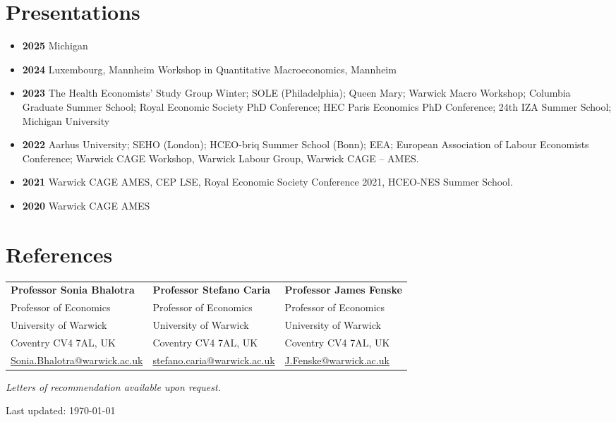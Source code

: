 \documentclass[11pt,a4paper]{article}
\begin{document}
\section{Presentations}
\begin{itemize}[leftmargin=*, itemsep=0.2em, label={}]
    \item \textbf{2025} \quad Michigan
    \item \textbf{2024} \quad Luxembourg, Mannheim Workshop in Quantitative Macroeconomics, Mannheim
    \item \textbf{2023} \quad The Health Economists' Study Group Winter; SOLE (Philadelphia); Queen Mary; Warwick Macro Workshop; Columbia Graduate Summer School; Royal Economic Society PhD Conference; HEC Paris Economics PhD Conference; 24th IZA Summer School; Michigan University
    \item \textbf{2022} \quad Aarhus University; SEHO (London); HCEO-briq Summer School (Bonn); EEA; European Association of Labour Economists Conference; Warwick CAGE Workshop, Warwick Labour Group, Warwick CAGE – AMES.
    \item \textbf{2021} \quad Warwick CAGE AMES, CEP LSE, Royal Economic Society Conference 2021, HCEO-NES Summer School.
    \item \textbf{2020} \quad Warwick CAGE AMES
\end{itemize}

\section{References}
\vspace{0.5em}
\begin{tabularx}{\textwidth}{@{}X X X@{}}
    \textbf{Professor Sonia Bhalotra} & \textbf{Professor Stefano Caria} & \textbf{Professor James Fenske} \\
    Professor of Economics & Professor of Economics & Professor of Economics \\
    University of Warwick & University of Warwick & University of Warwick \\
    Coventry CV4 7AL, UK & Coventry CV4 7AL, UK & Coventry CV4 7AL, UK \\
    \href{mailto:Sonia.Bhalotra@warwick.ac.uk}{Sonia.Bhalotra@warwick.ac.uk} & \href{mailto:stefano.caria@warwick.ac.uk}{stefano.caria@warwick.ac.uk} & \href{mailto:J.Fenske@warwick.ac.uk}{J.Fenske@warwick.ac.uk} \\
\end{tabularx}
\vspace{1em}
\begin{center}
    \textit{Letters of recommendation available upon request.}
\end{center}

\vfill
\begin{center}
    \small Last updated: \today
\end{center}
\end{document}
